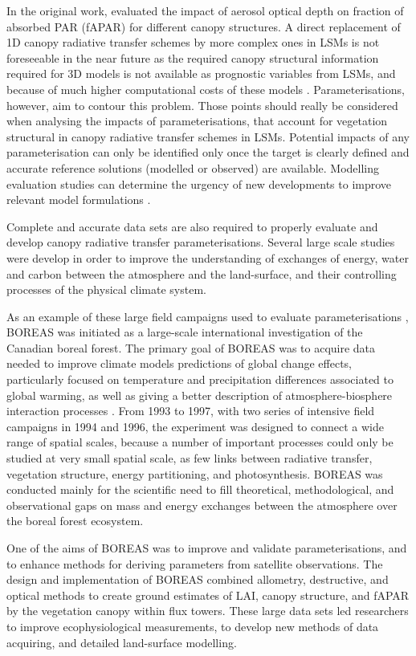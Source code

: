 In the original work, \citet{pinty2006} evaluated the impact of aerosol optical depth on fraction of absorbed PAR (fAPAR) for different canopy structures.  
A direct replacement of 1D canopy radiative transfer schemes by more complex ones  in LSMs is not foreseeable in the near future as the required canopy structural information required for 3D models is not available as prognostic variables from LSMs, and because of much higher computational costs of these models \citep{loew2014}. Parameterisations, however, aim to contour this problem.
Those points should really be considered when analysing the impacts of parameterisations, that account for vegetation structural in canopy radiative transfer schemes in LSMs. Potential impacts of any parameterisation can only be identified only once the target is clearly defined and accurate reference solutions (modelled or observed) are available. Modelling evaluation studies can determine the urgency of new developments to improve relevant model formulations \citep{Widlowski2013}.

Complete and accurate data sets are also required to properly evaluate and develop canopy radiative transfer parameterisations. Several large scale studies were develop in order to improve the understanding of exchanges of energy, water and carbon between the atmosphere and the land-surface, and their controlling processes of the physical climate system. 

As an example of these large field campaigns used to evaluate parameterisations \citep{Kucharik1999;pinty2006}, BOREAS was initiated as a large-scale international investigation of the Canadian boreal forest. The primary goal of BOREAS was to acquire data needed to improve climate models predictions of global change effects, particularly focused on temperature and precipitation differences associated to global warming, as well as giving a better description of atmosphere-biosphere interaction processes \citep{Sellers1997}. From 1993 to 1997, with two series of intensive field campaigns in 1994 and 1996, the experiment was designed to connect a wide range of spatial scales, because a number of important processes could only be studied at very small spatial scale, as few links between radiative transfer, vegetation structure, energy partitioning, and photosynthesis. BOREAS was conducted mainly for the scientific need to fill theoretical, methodological, and observational gaps on mass and energy exchanges between the atmosphere over the boreal forest ecosystem. 

One of the aims of BOREAS was to improve and validate parameterisations, and to enhance methods for deriving parameters from satellite observations. The design and implementation of BOREAS combined allometry, destructive, and optical methods to create ground estimates of LAI, canopy structure, and fAPAR by the vegetation canopy within flux towers. These large data sets led researchers to improve ecophysiological measurements, to develop new methods of data acquiring, and detailed land-surface modelling. 

